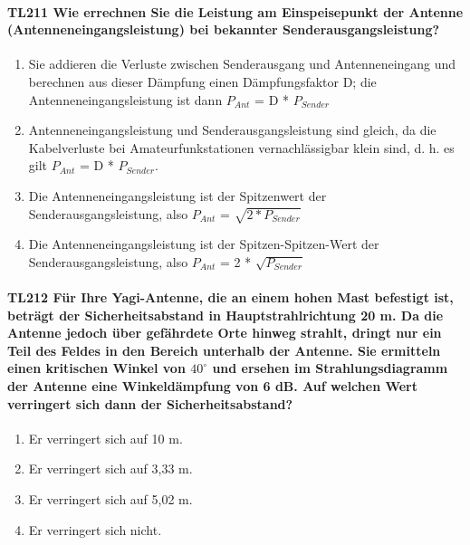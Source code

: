 \documentclass[8pt]{article}
\begin{document}
\paragraph*{TL211 Wie errechnen Sie die Leistung am Einspeisepunkt der Antenne (Antenneneingangsleistung) bei bekannter Senderausgangsleistung?}
\begin{enumerate}[nolistsep,label=\Alph*]
\item Sie addieren die Verluste zwischen Senderausgang und Antenneneingang und berechnen aus dieser Dämpfung einen Dämpfungsfaktor D; die Antenneneingangsleistung ist dann $P_{Ant}$ = D * $P_{Sender}$
\item Antenneneingangsleistung und Senderausgangsleistung sind gleich, da die Kabelverluste bei Amateurfunkstationen vernachlässigbar klein sind, d. h. es gilt $P_{Ant}$ = D * $P_{Sender}$.
\item Die Antenneneingangsleistung ist der Spitzenwert der Senderausgangsleistung, also $P_{Ant}$ = $\sqrt{2 * P_{Sender}}$
\item Die Antenneneingangsleistung ist der Spitzen-Spitzen-Wert der Senderausgangsleistung, also $P_{Ant}$ = 2 * $\sqrt{P_{Sender}}$
\end{enumerate}

\paragraph*{TL212 Für Ihre Yagi-Antenne, die an einem hohen Mast befestigt ist, beträgt der Sicherheitsabstand in Hauptstrahlrichtung 20 m. Da die Antenne jedoch über gefährdete Orte hinweg strahlt, dringt nur ein Teil des Feldes in den Bereich unterhalb der Antenne. Sie ermitteln einen kritischen Winkel von $40^{\circ}$ und ersehen im Strahlungsdiagramm der Antenne eine Winkeldämpfung von 6 dB. Auf welchen Wert verringert sich dann der Sicherheitsabstand?} 
\begin{enumerate}[nolistsep,label=\Alph*]
\item Er verringert sich auf 10 m.
\item Er verringert sich auf 3,33 m.
\item Er verringert sich auf 5,02 m.
\item Er verringert sich nicht.
\end{enumerate}
\end{document}
